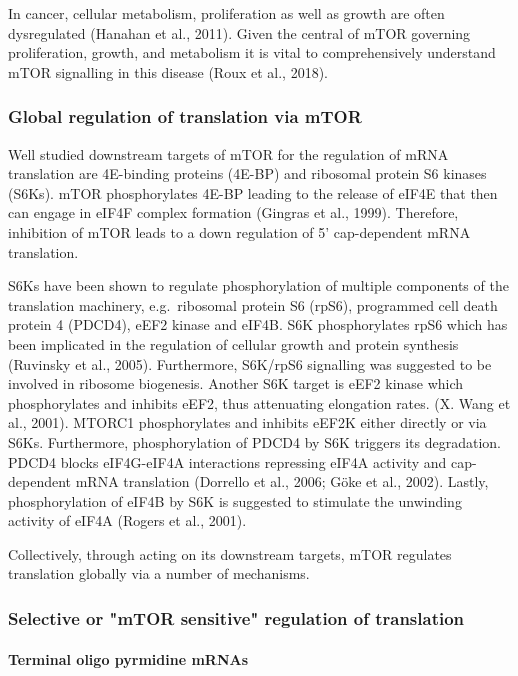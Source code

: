 \documentclass[
  12pt,
  openany]{book}
\begin{document}
In cancer, cellular metabolism, proliferation as well as growth are often dysregulated (Hanahan et al., 2011). Given the central of mTOR governing proliferation, growth, and metabolism it is vital to comprehensively understand mTOR signalling in this disease (Roux et al., 2018).

\subsubsection{Global regulation of translation via mTOR}

Well studied downstream targets of mTOR for the regulation of mRNA translation are 4E-binding proteins (4E-BP) and ribosomal protein S6 kinases (S6Ks). mTOR phosphorylates 4E-BP leading to the release of eIF4E that then can engage in eIF4F complex formation (Gingras et al., 1999). Therefore, inhibition of mTOR leads to a down regulation of 5' cap-dependent mRNA translation.

S6Ks have been shown to regulate phosphorylation of multiple components of the translation machinery, e.g.~ribosomal protein S6 (rpS6), programmed cell death protein 4 (PDCD4), eEF2 kinase and eIF4B. S6K phosphorylates rpS6 which has been implicated in the regulation of cellular growth and protein synthesis (Ruvinsky et al., 2005). Furthermore, S6K/rpS6 signalling was suggested to be involved in ribosome biogenesis. Another S6K target is eEF2 kinase which phosphorylates and inhibits eEF2, thus attenuating elongation rates. (X. Wang et al., 2001). MTORC1 phosphorylates and inhibits eEF2K either directly or via S6Ks. Furthermore, phosphorylation of PDCD4 by S6K triggers its degradation. PDCD4 blocks eIF4G-eIF4A interactions repressing eIF4A activity and cap-dependent mRNA translation (Dorrello et al., 2006; Göke et al., 2002). Lastly, phosphorylation of eIF4B by S6K is suggested to stimulate the unwinding activity of eIF4A (Rogers et al., 2001).

Collectively, through acting on its downstream targets, mTOR regulates translation globally via a number of mechanisms.

\subsubsection{Selective or "mTOR sensitive" regulation of translation}

\paragraph{Terminal oligo pyrmidine mRNAs}
\end{document}
